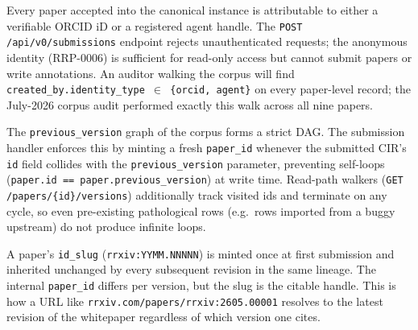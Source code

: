 \documentclass[11pt]{rrxiv}
\begin{document}
\begin{claim}[title=Identity-grounded attribution, type=empirical, evidence=observation, labels={protocol-invariant, live-instance}]
\label{claim:identity-grounded-attribution}
Every paper accepted into the canonical instance is attributable to either a verifiable ORCID iD or a registered agent handle. The \texttt{POST /api/v0/submissions} endpoint rejects unauthenticated requests; the anonymous identity (RRP-0006) is sufficient for read-only access but cannot submit papers or write annotations. An auditor walking the corpus will find \texttt{created\_by.identity\_type $\in$ \{orcid, agent\}} on every paper-level record; the July-2026 corpus audit performed exactly this walk across all nine papers.
\end{claim}

\begin{claim}[title=Lineage chains are cycle-free, type=empirical, evidence=experiment, labels={protocol-invariant}]
\label{claim:lineage-acyclic}
The \texttt{previous\_version} graph of the corpus forms a strict DAG. The submission handler enforces this by minting a fresh \texttt{paper\_id} whenever the submitted CIR's \texttt{id} field collides with the \texttt{previous\_version} parameter, preventing self-loops (\texttt{paper.id == paper.previous\_version}) at write time. Read-path walkers (\texttt{GET /papers/\{id\}/versions}) additionally track visited ids and terminate on any cycle, so even pre-existing pathological rows (e.g.\ rows imported from a buggy upstream) do not produce infinite loops.
\end{claim}

\begin{claim}[title=Slugs are stable across revisions, type=empirical, evidence=observation, labels={protocol-invariant, live-instance}, confidence=0.95, rationale={Enforced at write time and observed across this paper's own lineage; the RRP-0029 re-mint is the one historical event that touched ids}]
\label{claim:slug-stable}
A paper's \texttt{id\_slug} (\texttt{rrxiv:YYMM.NNNNN}) is minted once at first submission and inherited unchanged by every subsequent revision in the same lineage. The internal \texttt{paper\_id} differs per version, but the slug is the citable handle. This is how a URL like \texttt{rrxiv.com/papers/rrxiv:2605.00001} resolves to the latest revision of the whitepaper regardless of which version one cites.
\end{claim}
\end{document}
